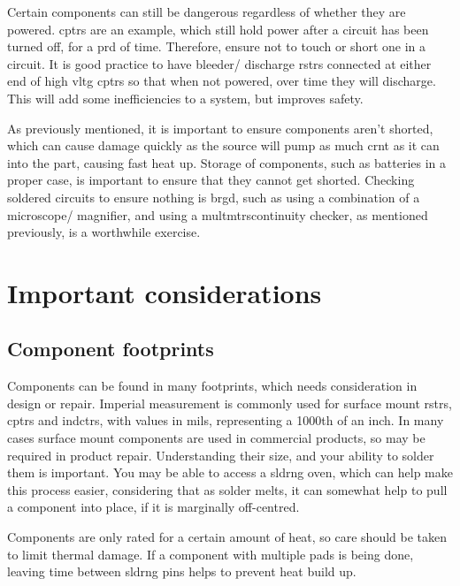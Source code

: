 \documentclass[a4paper,11pt]{report}
\begin{document}
Certain components can still be dangerous regardless of whether they are powered. \gls{cptr}s are an example, which still hold power after a circuit has been turned off, for a \gls{prd} of time. Therefore, ensure not to touch or short one in a circuit. It is good practice to have bleeder/ discharge \gls{rstr}s connected at either end of high \gls{vltg} \gls{cptr}s so that when not powered, over time they will discharge. This will add some inefficiencies to a system, but improves safety.

As previously mentioned, it is important to ensure components aren't shorted, which can cause damage quickly as the source will pump as much \gls{crnt} as it can into the part, causing fast heat up. Storage of components, such as batteries in a proper case, is important to ensure that they cannot get shorted. Checking soldered circuits to ensure nothing is \gls{brgd}, such as using a combination of a microscope/ magnifier, and using a \gls{multmtr}scontinuity checker, as mentioned previously, is a worthwhile exercise.

\pagebreak

\section{Important considerations}

\vspace*{1\baselineskip}

\subsection{Component footprints}

Components can be found in many footprints, which needs consideration in design or repair. Imperial measurement is commonly used for surface mount \gls{rstr}s, \gls{cptr}s and \gls{indctr}s, with values in mils, representing a 1000th of an inch. In many cases surface mount components are used in commercial products, so may be required in product repair. Understanding their size, and your ability to solder them is important. You may be able to access a \gls{sldrng} oven, which can help make this process easier, considering that as solder melts, it can somewhat help to pull a component into place, if it is marginally off-centred.

Components are only rated for a certain amount of heat, so care should be taken to limit thermal damage. If a component with multiple pads is being done, leaving time between \gls{sldrng} pins helps to prevent heat build up.
\end{document}
